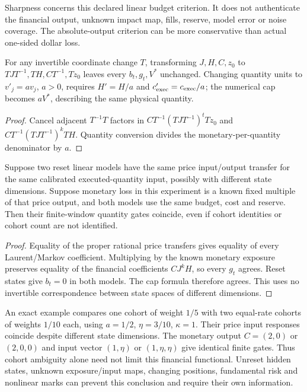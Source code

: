 Sharpness concerns this declared linear budget criterion. It does not authenticate the financial output, unknown impact map, fills, reserve, model error or noise coverage. The absolute-output criterion can be more conservative than actual one-sided dollar loss.

\begin{proposition}
For any invertible coordinate change $T$, transforming $J,H,C,z_0$ to $TJT^{-1},TH,CT^{-1},Tz_0$ leaves every $b_t,g_t,V^*$ unchanged. Changing quantity units to $v'_j=av_j$, $a>0$, requires $H'=H/a$ and $c'_{\rm exec}=c_{\rm exec}/a$; the numerical cap becomes $aV^*$, describing the same physical quantity.
\end{proposition}
\begin{proof}
Cancel adjacent $T^{-1}T$ factors in $CT^{-1}(TJT^{-1})^tTz_0$ and $CT^{-1}(TJT^{-1})^kTH$. Quantity conversion divides the monetary-per-quantity denominator by $a$.
\end{proof}


\begin{proposition}
Suppose two reset linear models have the same price input/output transfer for the same calibrated executed-quantity input, possibly with different state dimensions. Suppose monetary loss in this experiment is a known fixed multiple of that price output, and both models use the same budget, cost and reserve. Then their finite-window quantity gates coincide, even if cohort identities or cohort count are not identified.
\end{proposition}
\begin{proof}
Equality of the proper rational price transfers gives equality of every Laurent/Markov coefficient. Multiplying by the known monetary exposure preserves equality of the financial coefficients $CJ^kH$, so every $g_t$ agrees. Reset states give $b_t=0$ in both models. The cap formula therefore agrees. This uses no invertible correspondence between state spaces of different dimensions.
\end{proof}

An exact example compares one cohort of weight $1/5$ with two equal-rate cohorts of weights $1/10$ each, using $a=1/2$, $\eta=3/10$, $\kappa=1$. Their price input responses coincide despite different state dimensions. The monetary output $C=(2,0)$ or $(2,0,0)$ and input vector $(1,\eta)$ or $(1,\eta,\eta)$ give identical finite gates. Thus cohort ambiguity alone need not limit this financial functional. Unreset hidden states, unknown exposure/input maps, changing positions, fundamental risk and nonlinear marks can prevent this conclusion and require their own information.


